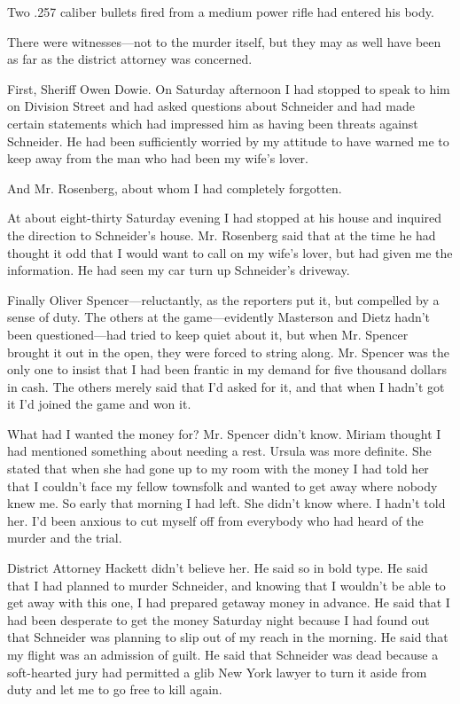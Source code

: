 \documentclass{novel}
\begin{document}
Two .257 caliber bullets fired from a medium power rifle had entered his body.

There were witnesses—not to the murder itself, but they may as well have been as far as the district attorney was concerned.

First, Sheriff Owen Dowie. On Saturday afternoon I had stopped to speak to him on Division Street and had asked questions about Schneider and had made certain statements which had impressed him as having been threats against Schneider. He had been sufficiently worried by my attitude to have warned me to keep away from the man who had been my wife’s lover.

And Mr. Rosenberg, about whom I had completely forgotten. 

At about eight-thirty Saturday evening I had stopped at his house and inquired the direction to Schneider’s house. Mr. Rosenberg said that at the time he had thought it odd that I would want to call on my wife’s lover, but had given me the information. He had seen my car turn up Schneider’s driveway.

Finally Oliver Spencer—reluctantly, as the reporters put it, but compelled by a sense of duty. The others at the game—evidently Masterson and Dietz hadn’t been questioned—had tried to keep quiet about it, but when Mr. Spencer brought it out in the open, they were forced to string along. Mr. Spencer was the only one to insist that I had been frantic in my demand for five thousand dollars in cash. The others merely said that I’d asked for it, and that when I hadn’t got it I’d joined the game and won it.

What had I wanted the money for? Mr. Spencer didn’t know. Miriam thought I had mentioned something about needing a rest. Ursula was more definite. She stated that when she had gone up to my room with the money I had told her that I couldn’t face my fellow townsfolk and wanted to get away where nobody knew me. So early that morning I had left. She didn’t know where. I hadn’t told her. I’d been anxious to cut myself off from everybody who had heard of the murder and the trial.

District Attorney Hackett didn’t believe her. He said so in bold type. He said that I had planned to murder Schneider, and knowing that I wouldn’t be able to get away with this one, I had prepared getaway money in advance. He said that I had been desperate to get the money Saturday night because I had found out that Schneider was planning to slip out of my reach in the morning. He said that my flight was an admission of guilt. He said that Schneider was dead because a soft-hearted jury had permitted a glib New York lawyer to turn it aside from duty and let me to go free to kill again.
\end{document}
